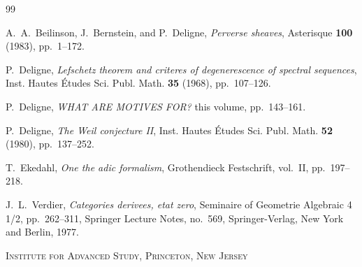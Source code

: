 \documentclass[11pt,a4paper]{article}
\theoremstyle{plain}
\theoremstyle{definition}
\begin{document}
\begin{thebibliography}{99}

A.~A.~Beilinson, J.~Bernstein, and P.~Deligne, \textit{Perverse sheaves}, Asterisque {\bf 100} (1983), pp.~1--172.

P.~Deligne, \textit{Lefschetz theorem and criteres of degenerescence of spectral sequences}, Inst. Hautes \'Etudes Sci. Publ. Math. {\bf 35} (1968), pp.~107--126.

P.~Deligne, \textit{WHAT ARE MOTIVES FOR?} this volume, pp.~143--161.

P.~Deligne, \textit{The Weil conjecture II}, Inst. Hautes \'Etudes Sci. Publ. Math. {\bf 52} (1980), pp.~137--252.

T.~Ekedahl, \textit{One the adic formalism}, Grothendieck Festschrift, vol.~II, pp.~197--218.

J.~L.~Verdier, \textit{Categories derivees, etat zero}, Seminaire of Geometrie Algebraic 4 1/2, pp.~262--311, Springer Lecture Notes, no.~569, Springer-Verlag, New York and Berlin, 1977.

\end{thebibliography}

\medskip
\noindent\textsc{Institute for Advanced Study, Princeton, New Jersey}
\end{document}
